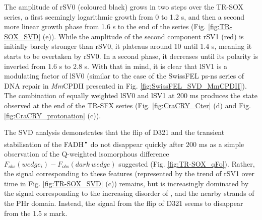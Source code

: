The amplitude of rSV0 (coloured black) grows in two steps over the TR-SOX series, a first seemingly logarithmic growth from 0 to 1.2 s, and then a second more linear growth phase from 1.6 s to the end of the series (Fig. \ref{fig:TR-SOX_SVD} (e)). While the amplitude of the second component rSV1 (red) is initially barely stronger than rSV0, it plateaus around 10 until 1.4 s, meaning it starts to be overtaken by rSV0. In a second phase, it decreases until its polarity is inverted from 1.6 s to 2.8 s. With that in mind, it is clear that lSV1 is a modulating factor of lSV0 (similar to the case of the SwissFEL ps-ns series of DNA repair in \textit{Mm}CPDII presented in Fig. \ref{fig:SwissFEL_SVD_MmCPDII}). The combination of equally weighted lSV0 and lSV1 at 200 ms produces the state observed at the end of the TR-SFX series (Fig. \ref{fig:CraCRY_Cter} (d) and Fig. \ref{fig:CraCRY_protonation} (c)). 

The SVD analysis demonstrates that the flip of D321 and the transient stabilisation of the FADH\textsuperscript{•} do not disappear quickly after 200 ms as a simple observation of the Q-weighted isomorphous difference \(F_{obs}(wedge_i) - F_{obs}(dark\ wedge)\) suggested (Fig. \ref{fig:TR-SOX_qFo}). Rather, the signal corresponding to these features (represented by the trend of rSV1 over time in Fig. \ref{fig:TR-SOX_SVD} (c)) remains, but is increasingly dominated by the signal corresponding to the increasing disorder of , and the nearby strands of the PHr domain. Instead, the signal from the flip of D321 seems to disappear from the 1.5 s mark. 

